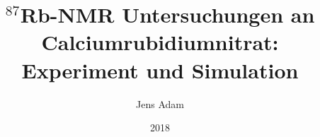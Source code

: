 \documentclass[
  BCOR=12mm,     %
  parskip=half,  %
  open=any,      %
  cleardoublepage=plain,  %
]{tudothesis}
\author{Jens Adam}
\title{$^\text{87}$Rb-NMR Untersuchungen an Calciumrubidiumnitrat:\\Experiment und Simulation}
\date{2018}
\begin{document}
\frontmatter
\maketitle

\makecorrectorpage

%
\tableofcontents

\mainmatter







\printbibliography

\appendix
% 
% 
% 


\backmatter


\cleardoublepage

\end{document}
